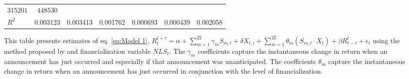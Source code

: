 \begin{sidewaystable}
{\begin{tabular}{@{}lllllllllllll@{}}
315201 }                                                   & \multicolumn{2}{c}{ 448530 }                                                 \\ \textbf{$R^2$}             &\multicolumn{2}{c}{ 0.003123 }                                                 & \multicolumn{2}{c}{ 0.003413 }                                                 & \multicolumn{2}{c}{ 0.001762 }                                                 & \multicolumn{2}{c}{ 0.000693 }                                                 & \multicolumn{2}{c}{ 0.000439 }                                                   & \multicolumn{2}{c}{ 0.002058 }                                                 \\ \bottomrule 
\end{tabular}
}
\begin{tablenotes}\item 
    \singlespacing
    \footnotesize
    This table presents estimates of eq. \ref{eq:Model 1}, $R_{t}^{t+\tau}=\alpha+\sum_{m=1}^{22} \gamma_m S_{m,t}+ \delta X_{t,i} + \sum_{m=1}^{22} \theta_m (S_{m,t} \cdot X_t)+\beta R_{t-\tau}^{t}+\epsilon_{t}$ using the method proposed by \citet{kurov2019price} and financialization variable $NLS_t$. The $\gamma_m$ coefficients capture the instantaneous change in return when an announcement has just occurred and especially if that announcement was unanticipated. The coefficients $\theta_m$ capture the instantaneous change in return when an announcement has just occurred in conjunction with the level of financialization.
\end{tablenotes}
\end{sidewaystable}




